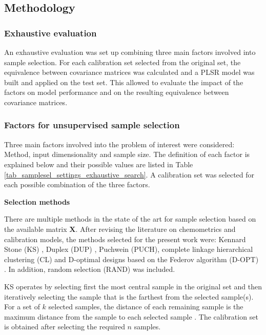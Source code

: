 \documentclass[journal=ancham,manuscript=article]{achemso}
\begin{document}
\subsection{Methodology}\label{methodology}

\subsubsection{Exhaustive evaluation}

An exhaustive evaluation was set up combining three main factors involved into sample selection. For each calibration set selected from the original set, the equivalence between covariance matrices was calculated and a PLSR model was built and applied on the test set. This allowed to evaluate the impact of the factors on model performance and on the resulting equivalence between covariance matrices. 


\subsubsection{Factors for unsupervised sample selection}

Three main factors involved into the problem of interest were considered: Method, input dimensionality and sample size. The definition of each factor is explained below and their possible values are listed in Table \ref{tab_samplesel_settings_exhaustive_search}. A calibration set was selected for each possible combination of the three factors.

\textbf{Selection methods}

There are multiple methods in the state of the art for sample selection based on the available matrix $\mathbf{X}$. After revising the literature on chemometrics and calibration models, the methods selected for the present work were: Kennard Stone (KS) \cite{Kennard1969}, Duplex (DUP) \cite{Snee1977}, Puchwein (PUCH)\cite{Puchwein1988}, complete linkage hierarchical clustering (CL) \cite{Naes1990} and D-optimal designs based on the Federov algorithm (D-OPT) \cite{Goos2011}. In addition, random selection (RAND) was included. 

KS operates by selecting first the most central sample in the original set and then iteratively selecting the sample that is the farthest from the selected sample(s). For a set of $k$ selected samples, the distance of each remaining sample is the maximum distance from the sample to each selected sample \cite{Kennard1969}. The calibration set is obtained after selecting the required $n$ samples.
\end{document}
